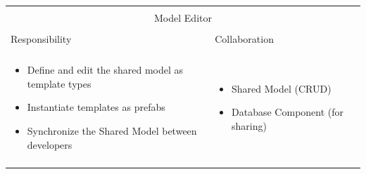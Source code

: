 \vspace{0.5cm} \noindent      
\begin{tabular}{|l|l|}
    \cline{1-2}
    \multicolumn{2}{|c|}{} \\[-0.3cm]
    \multicolumn{2}{|c|}{Model Editor} \\ 
    \multicolumn{2}{|c|}{} \\[-0.3cm]
    \cline{1-2}
    Responsibility & Collaboration \\
    \cline{1-2}
    & \\[-0.2cm]
    \begin{minipage}{0.47\textwidth}
        \begin{itemize}
          \item Define and edit the shared model as template types
          \item Instantiate templates as prefabs
          \item Synchronize the Shared Model between developers
        \end{itemize} 
    \end{minipage}
	&
    \begin{minipage}{0.47\textwidth}
        \begin{itemize}
          \item Shared Model (CRUD)
          \item Database Component (for sharing)
        \end{itemize} 
    \end{minipage}
	\\ & \\
    \hline
\end{tabular}

